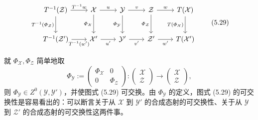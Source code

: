 \begin{equation}
\begin{tikzcd}[row sep=2.4em, column sep=2.2em]
  T^{-1}(\mathcal{Z}) \arrow[r,"T^{-1}w"] \arrow[d,"T^{-1}(\varPhi_{\mathcal{Z}})"'] & \mathcal{X} \arrow[r,"u"] \arrow[d,"\varPhi_{\mathcal{X}}"'] & \mathcal{Y} \arrow[r,"v"] \arrow[d,"\varPhi_{\mathcal{Y}}"'] & \mathcal{Z} \arrow[r,"w"] \arrow[d,"\varPhi_{\mathcal{Z}}"'] & T(\mathcal{X}) \arrow[d,"T(\varPhi_{\mathcal{X}})"']\\
  T^{-1}(\mathcal{Z}') \arrow[r,"T^{-1}(w')"'] & \mathcal{X}' \arrow[r,"u'"'] & \mathcal{Y}' \arrow[r,"v'"'] & \mathcal{Z}' \arrow[r,"w'"'] & T(\mathcal{X}')
\end{tikzcd}
\tag{5.29}
\end{equation}

就 $\varPhi_{\mathcal{X}}, \varPhi_{\mathcal{Z}}$ 简单地取
\[
  \varPhi_{\mathcal{Y}} :=
  \begin{pmatrix}
    \varPhi_{\mathcal{X}} & 0\\
    0 & \varPhi_{\mathcal{Z}}
  \end{pmatrix}
  \colon \begin{pmatrix}\mathcal{X}\\ \mathcal{Z}\end{pmatrix} \to \begin{pmatrix}\mathcal{X}\\ \mathcal{Z}\end{pmatrix},
\]
则 $\varPhi_{\mathcal{Y}} \in Z^{0}(\mathcal{Y},\mathcal{Y}')$，并使图式 (5.29) 可交换。由 $\varPhi_{\mathcal{Y}}$ 的定义，图式 (5.29) 的可交换性是容易看出的：可以断言关于从 $\mathcal{X}$ 到 $\mathcal{Y}'$ 的合成态射的可交换性、关于从 $\mathcal{Y}$ 到 $\mathcal{Z}'$ 的合成态射的可交换性这两件事。


